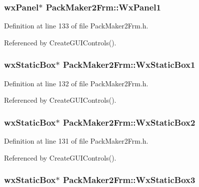 \subsubsection{\setlength{\rightskip}{0pt plus 5cm}wx\-Panel$\ast$ {\bf Pack\-Maker2Frm::Wx\-Panel1}\hspace{0.3cm}{\tt  [private]}}\label{class_pack_maker2_frm_d96a735c5711ca782a56db8bc8b3d8e2}




Definition at line 133 of file Pack\-Maker2Frm.h.

Referenced by Create\-GUIControls().
\subsubsection{\setlength{\rightskip}{0pt plus 5cm}wx\-Static\-Box$\ast$ {\bf Pack\-Maker2Frm::Wx\-Static\-Box1}\hspace{0.3cm}{\tt  [private]}}\label{class_pack_maker2_frm_6bc14556088100a5f9ba2d914779b011}




Definition at line 132 of file Pack\-Maker2Frm.h.

Referenced by Create\-GUIControls().
\subsubsection{\setlength{\rightskip}{0pt plus 5cm}wx\-Static\-Box$\ast$ {\bf Pack\-Maker2Frm::Wx\-Static\-Box2}\hspace{0.3cm}{\tt  [private]}}\label{class_pack_maker2_frm_419dc98d8cf62f89470d1f9bdaeb481f}




Definition at line 131 of file Pack\-Maker2Frm.h.

Referenced by Create\-GUIControls().
\subsubsection{\setlength{\rightskip}{0pt plus 5cm}wx\-Static\-Box$\ast$ {\bf Pack\-Maker2Frm::Wx\-Static\-Box3}\hspace{0.3cm}{\tt  [private]}}\label{class_pack_maker2_frm_6f3040fd690650804094e2a44dee9ea3}




